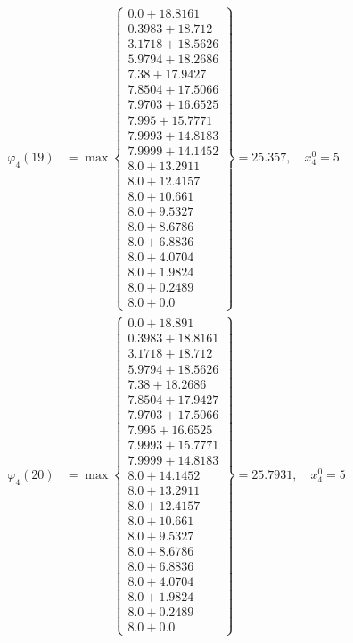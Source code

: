 \documentclass{article}
\begin{document}
\begin{align*}
  
  
  
\varphi_{4}(19) &= \max \left\{ \begin{array}{c}
0.0 + 18.8161 \\
 0.3983 + 18.712 \\
 3.1718 + 18.5626 \\
 5.9794 + 18.2686 \\
 7.38 + 17.9427 \\
 7.8504 + 17.5066 \\
 7.9703 + 16.6525 \\
 7.995 + 15.7771 \\
 7.9993 + 14.8183 \\
 7.9999 + 14.1452 \\
 8.0 + 13.2911 \\
 8.0 + 12.4157 \\
 8.0 + 10.661 \\
 8.0 + 9.5327 \\
 8.0 + 8.6786 \\
 8.0 + 6.8836 \\
 8.0 + 4.0704 \\
 8.0 + 1.9824 \\
 8.0 + 0.2489 \\
 8.0 + 0.0
\end{array} \right\}=25.357,\quad x_{4}^0=5\\
  
  
  
  
\varphi_{4}(20) &= \max \left\{ \begin{array}{c}
0.0 + 18.891 \\
 0.3983 + 18.8161 \\
 3.1718 + 18.712 \\
 5.9794 + 18.5626 \\
 7.38 + 18.2686 \\
 7.8504 + 17.9427 \\
 7.9703 + 17.5066 \\
 7.995 + 16.6525 \\
 7.9993 + 15.7771 \\
 7.9999 + 14.8183 \\
 8.0 + 14.1452 \\
 8.0 + 13.2911 \\
 8.0 + 12.4157 \\
 8.0 + 10.661 \\
 8.0 + 9.5327 \\
 8.0 + 8.6786 \\
 8.0 + 6.8836 \\
 8.0 + 4.0704 \\
 8.0 + 1.9824 \\
 8.0 + 0.2489 \\
 8.0 + 0.0
\end{array} \right\}=25.7931,\quad x_{4}^0=5\\
  

\end{align*}
\end{document}
